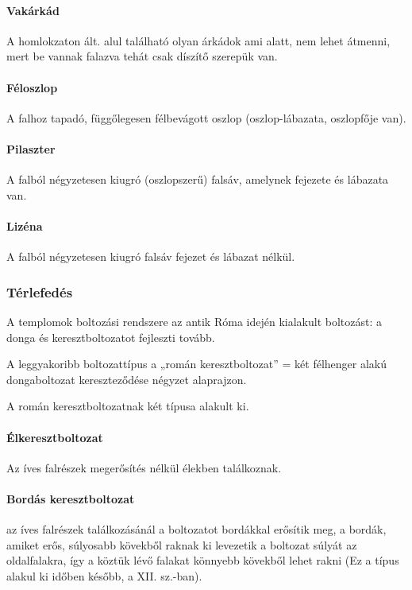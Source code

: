 	\paragraph{Vakárkád}
	A homlokzaton ált. alul található olyan árkádok ami alatt, nem lehet
	átmenni, mert be vannak falazva tehát csak díszítő szerepük van.
	
	\paragraph{Féloszlop}
	A falhoz tapadó, függőlegesen félbevágott oszlop (oszlop-lábazata,
	oszlopfője van).
	
	\paragraph{Pilaszter}
	A falból négyzetesen kiugró (oszlopszerű) falsáv, amelynek fejezete és
	lábazata van.
	
	\paragraph{Lizéna}
	A falból négyzetesen kiugró falsáv fejezet és lábazat nélkül.
	
	
	\subsubsection{Térlefedés}
	
	A templomok boltozási rendszere az antik Róma idején kialakult boltozást: a donga és keresztboltozatot fejleszti tovább.
	
	A leggyakoribb boltozattípus a „román
	keresztboltozat” = két félhenger alakú dongaboltozat
	kereszteződése négyzet alaprajzon.
	
	A román keresztboltozatnak két típusa alakult ki.
	
	\paragraph{Élkeresztboltozat}
	Az íves falrészek megerősítés nélkül élekben találkoznak.
	
	\paragraph{Bordás keresztboltozat}
	az íves falrészek találkozásánál a boltozatot bordákkal erősítik meg, a bordák, amiket erős, súlyosabb kövekből raknak ki levezetik a boltozat súlyát az oldalfalakra, így a köztük lévő falakat könnyebb kövekből lehet rakni (Ez a típus alakul ki időben később, a XII. sz.-ban).
	
